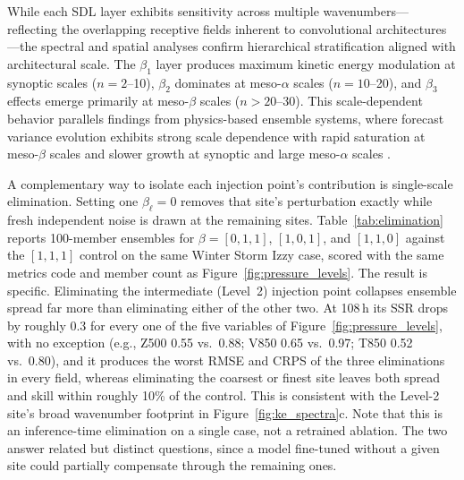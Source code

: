\documentclass{agujournal2019}
\begin{document}
While each SDL layer exhibits sensitivity across multiple wavenumbers—reflecting the overlapping receptive fields inherent to convolutional architectures—the spectral and spatial analyses confirm hierarchical stratification aligned with architectural scale. The $\beta_1$ layer produces maximum kinetic energy modulation at synoptic scales ($n=2$--10), $\beta_2$ dominates at meso-$\alpha$ scales ($n=10$--20), and $\beta_3$ effects emerge primarily at meso-$\beta$ scales ($n>20$--30). This scale-dependent behavior parallels findings from physics-based ensemble systems, where forecast variance evolution exhibits strong scale dependence with rapid saturation at meso-$\beta$ scales and slower growth at synoptic and large meso-$\alpha$ scales \cite{rodwell2025}.

A complementary way to isolate each injection point's contribution is single-scale elimination. Setting one $\beta_\ell = 0$ removes that site's perturbation exactly while fresh independent noise is drawn at the remaining sites. Table~\ref{tab:elimination} reports 100-member ensembles for $\beta = [0,1,1]$, $[1,0,1]$, and $[1,1,0]$ against the $[1,1,1]$ control on the same Winter Storm Izzy case, scored with the same metrics code and member count as Figure~\ref{fig:pressure_levels}. The result is specific. Eliminating the intermediate (Level~2) injection point collapses ensemble spread far more than eliminating either of the other two. At 108\,h its SSR drops by roughly 0.3 for every one of the five variables of Figure~\ref{fig:pressure_levels}, with no exception (e.g., Z500 0.55 vs.\ 0.88; V850 0.65 vs.\ 0.97; T850 0.52 vs.\ 0.80), and it produces the worst RMSE and CRPS of the three eliminations in every field, whereas eliminating the coarsest or finest site leaves both spread and skill within roughly 10\% of the control. This is consistent with the Level-2 site's broad wavenumber footprint in Figure~\ref{fig:ke_spectra}c. Note that this is an inference-time elimination on a single case, not a retrained ablation. The two answer related but distinct questions, since a model fine-tuned without a given site could partially compensate through the remaining ones.
\end{document}
